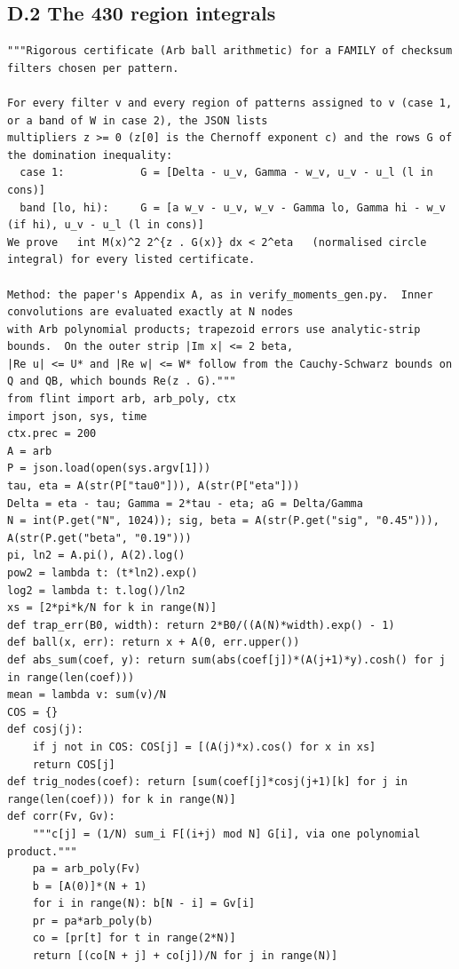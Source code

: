\documentclass[10pt,a4paper]{article}
\begin{document}
\subsection*{D.2 The 430 region integrals}

\begin{lstlisting}
"""Rigorous certificate (Arb ball arithmetic) for a FAMILY of checksum filters chosen per pattern.

For every filter v and every region of patterns assigned to v (case 1, or a band of W in case 2), the JSON lists
multipliers z >= 0 (z[0] is the Chernoff exponent c) and the rows G of the domination inequality:
  case 1:            G = [Delta - u_v, Gamma - w_v, u_v - u_l (l in cons)]
  band [lo, hi):     G = [a w_v - u_v, w_v - Gamma lo, Gamma hi - w_v (if hi), u_v - u_l (l in cons)]
We prove   int M(x)^2 2^{z . G(x)} dx < 2^eta   (normalised circle integral) for every listed certificate.

Method: the paper's Appendix A, as in verify_moments_gen.py.  Inner convolutions are evaluated exactly at N nodes
with Arb polynomial products; trapezoid errors use analytic-strip bounds.  On the outer strip |Im x| <= 2 beta,
|Re u| <= U* and |Re w| <= W* follow from the Cauchy-Schwarz bounds on Q and QB, which bounds Re(z . G)."""
from flint import arb, arb_poly, ctx
import json, sys, time
ctx.prec = 200
A = arb
P = json.load(open(sys.argv[1]))
tau, eta = A(str(P["tau0"])), A(str(P["eta"]))
Delta = eta - tau; Gamma = 2*tau - eta; aG = Delta/Gamma
N = int(P.get("N", 1024)); sig, beta = A(str(P.get("sig", "0.45"))), A(str(P.get("beta", "0.19")))
pi, ln2 = A.pi(), A(2).log()
pow2 = lambda t: (t*ln2).exp()
log2 = lambda t: t.log()/ln2
xs = [2*pi*k/N for k in range(N)]
def trap_err(B0, width): return 2*B0/((A(N)*width).exp() - 1)
def ball(x, err): return x + A(0, err.upper())
def abs_sum(coef, y): return sum(abs(coef[j])*(A(j+1)*y).cosh() for j in range(len(coef)))
mean = lambda v: sum(v)/N
COS = {}
def cosj(j):
    if j not in COS: COS[j] = [(A(j)*x).cos() for x in xs]
    return COS[j]
def trig_nodes(coef): return [sum(coef[j]*cosj(j+1)[k] for j in range(len(coef))) for k in range(N)]
def corr(Fv, Gv):
    """c[j] = (1/N) sum_i F[(i+j) mod N] G[i], via one polynomial product."""
    pa = arb_poly(Fv)
    b = [A(0)]*(N + 1)
    for i in range(N): b[N - i] = Gv[i]
    pr = pa*arb_poly(b)
    co = [pr[t] for t in range(2*N)]
    return [(co[N + j] + co[j])/N for j in range(N)]


\end{lstlisting}
\end{document}
